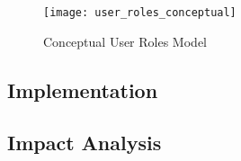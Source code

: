 \begin{figure}[H]
  \centering
  \texttt{[image: user\_roles\_conceptual]}
  \caption{Conceptual User Roles Model}
  \label{fig:user_roles_conceptual}
\end{figure}

\subsection{Implementation}\label{sec:fa_roles_implementation}

\subsection{Impact Analysis}\label{sec:fa_roles_impact_analysis}
